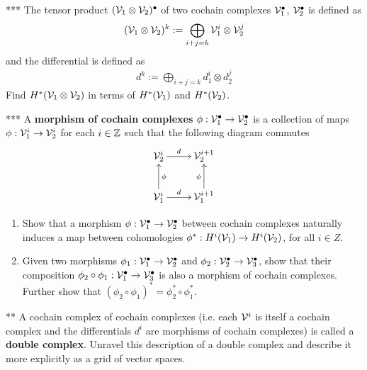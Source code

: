 \begin{ques}***
  The tensor product $(\mathcal{V}_1 \otimes \mathcal{V}_2)^\bullet$ of two cochain complexes $\mathcal{V}_1^\bullet$, $\mathcal{V}_2^\bullet$ is defined as
  \begin{align*}
    (\mathcal{V}_1 \otimes \mathcal{V}_2)^k := \bigoplus \limits_{i + j = k} \mathcal{V}_1^i \otimes \mathcal{V}_2^j
  \end{align*}
  and the differential is defined as
  \begin{align*}
    d^k := \bigoplus \limits_{i + j = k} d_1^i \otimes d_2^j
  \end{align*}
  Find $H^*(\mathcal{V}_1 \otimes \mathcal{V}_2)$ in terms of $H^*(\mathcal{V}_1)$ and $H^*(\mathcal{V}_2)$.
\end{ques}
\newpage
\begin{ques}***
  A \textbf{morphism of cochain complexes} $\phi: \mathcal{V}_1^\bullet \rightarrow \mathcal{V}_2^\bullet$ is a collection of maps $ \phi: \mathcal{V}_1^i \rightarrow \mathcal{V}_2^i$ for each $ i \in \mathbb{Z}$ such that the following diagram commutes
  \begin{align*}
    \xymatrix{
    \V_2^i \ar^-{d}[r]  & \V_2^{i+1}  \\
    \V_1^i \ar^-{d}[r] \ar_{\phi}[u] & \V_1^{i+1} \ar^{\phi}[u]
    }
  \end{align*}
  \begin{enumerate}
    \item Show that a morphism $\phi: \mathcal{V}_1^\bullet \rightarrow \mathcal{V}_2^\bullet$ between cochain complexes naturally induces a map between cohomologies $\phi^*: H^i(\mathcal{V}_1) \rightarrow H^i(\mathcal{V}_2)$, for all $ i \in Z$.
    \item Given two morphisms $\phi_1: \mathcal{V}_1^\bullet \rightarrow \mathcal{V}_2^\bullet$ and $\phi_2: \mathcal{V}_2^\bullet \rightarrow \mathcal{V}_3^\bullet$, show that their composition $\phi_2 \circ \phi_1: \mathcal{V}_1^\bullet \rightarrow \mathcal{V}_3^\bullet$ is also a morphism of cochain complexes. Further show that $ (\phi_2 \circ \phi_1)^* = \phi_2^* \circ \phi_1^*$.
  \end{enumerate}
\end{ques}

\begin{ques}**
  A cochain complex of cochain complexes (i.e. each $\mathcal{V}^i$ is itself a cochain complex and the differentials $d^i$ are morphisms of cochain complexes) is called a \textbf{double complex}. Unravel this description of a double complex and describe it more explicitly as a grid of vector spaces.
\end{ques}

